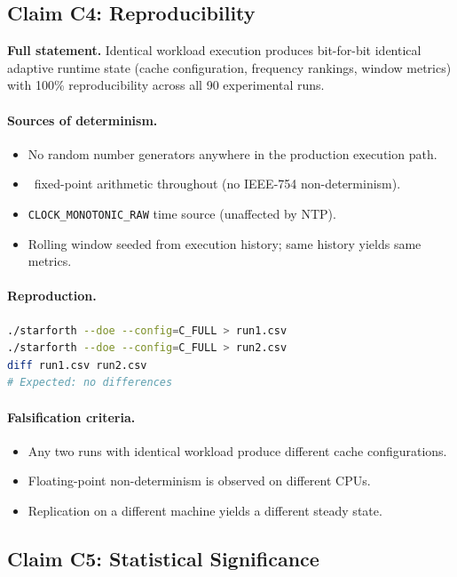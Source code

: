\subsection{Claim C4: Reproducibility}

\textbf{Full statement.} Identical workload execution produces bit-for-bit
identical adaptive runtime state (cache configuration, frequency rankings,
window metrics) with 100\% reproducibility across all 90 experimental runs.

\paragraph{Sources of determinism.}
\begin{itemize}
  \item No random number generators anywhere in the production execution path.
  \item \Qtype\ fixed-point arithmetic throughout (no IEEE-754 non-determinism).
  \item \texttt{CLOCK\_MONOTONIC\_RAW} time source (unaffected by NTP).
  \item Rolling window seeded from execution history; same history yields same metrics.
\end{itemize}

\paragraph{Reproduction.}
\begin{lstlisting}[language=bash]
./starforth --doe --config=C_FULL > run1.csv
./starforth --doe --config=C_FULL > run2.csv
diff run1.csv run2.csv
# Expected: no differences
\end{lstlisting}

\paragraph{Falsification criteria.}
\begin{itemize}
  \item Any two runs with identical workload produce different cache configurations.
  \item Floating-point non-determinism is observed on different CPUs.
  \item Replication on a different machine yields a different steady state.
\end{itemize}

\subsection{Claim C5: Statistical Significance}

